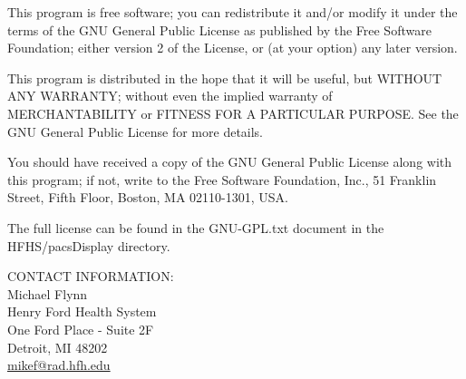 \begin{titlepage}
\begin{center}
\vspace{3 em}

\begin{minipage}{0.8\textwidth}
\normalsize{This program is free software; you can redistribute it and/or modify it under the terms of the GNU General Public License as published by the Free Software Foundation; either version 2 of the License, or
(at your option) any later version.
\bigskip

This program is distributed in the hope that it will be useful, but WITHOUT ANY WARRANTY; without even the implied warranty of MERCHANTABILITY or FITNESS FOR A PARTICULAR PURPOSE.  See the GNU General Public License for more details.
\bigskip

You should have received a copy of the GNU General Public License along with this program; if not, write to the Free Software Foundation, Inc., 51 Franklin Street, Fifth Floor, Boston, MA
02110-1301, USA.
\bigskip

The full license can be found in the GNU-GPL.txt document in the
HFHS/pacsDisplay directory.}
\end{minipage}

\vfill

\begin{minipage}{0.75\textwidth}
\begin{center}
\normalsize{CONTACT INFORMATION:\\
Michael Flynn\\
Henry Ford Health System\\
One Ford Place - Suite 2F\\
Detroit, MI 48202\\
\href{mailto:mikef@rad.hfh.edu}{mikef@rad.hfh.edu}}
\end{center}
\end{minipage}

\end{center}
\end{titlepage}

\tableofcontents
\clearpage